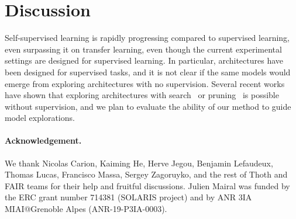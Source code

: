 \documentclass{article}
\begin{document}
\section{Discussion}
Self-supervised learning is rapidly progressing compared to supervised learning, even surpassing it on transfer learning, even though the current experimental settings are designed for supervised learning.
In particular, architectures have been designed for supervised tasks, and it is not clear if the same models would emerge from exploring architectures with no supervision.
Several recent works have shown that exploring architectures with search~\cite{liu2020labels} or pruning~\cite{caron2020pruning} is possible without supervision, and we plan to evaluate the ability of our method to guide model explorations.

\paragraph{Acknowledgement.}
We thank Nicolas Carion, Kaiming He, Herve Jegou, Benjamin Lefaudeux, Thomas Lucas, Francisco Massa, Sergey Zagoruyko, and the rest of Thoth and FAIR teams for their help and fruitful discussions.
Julien Mairal was funded by the ERC grant number 714381 (SOLARIS project) and by ANR 3IA MIAI@Grenoble Alpes (ANR-19-P3IA-0003).





\newpage

\end{document}
